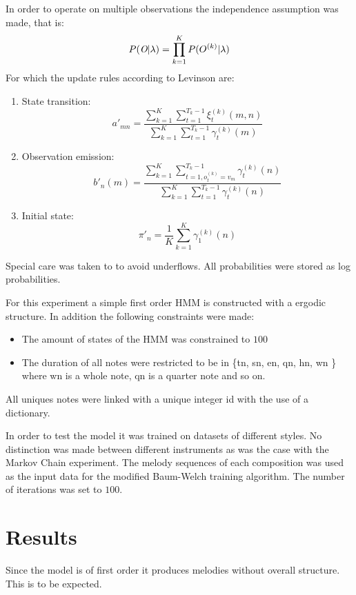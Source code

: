 In order to operate on multiple observations the independence assumption was made, that is:
\[ P(\emph{O} | \lambda) = \prod_{k=1}^K P(O^{(k)} | \lambda) \]
For which the update rules according to Levinson are:
\begin{enumerate}
\item State transition:
\[ a'_{mn} = \frac{\sum^K_{k=1} \sum^{T_k -1 }_{t=1} \xi^{(k)}_t (m,n)}{\sum^K_{k=1} \sum^{T_k-1}_{t=1} \gamma_t^{(k)}(m)} \]

\item Observation emission:
\[ b'_n (m) = \frac{\sum^K_{k=1} \sum^{T_k -1 }_{t=1, o_t^{(k)} = v_m} \gamma^{(k)}_t (n)}{\sum^K_{k=1} \sum^{T_k-1}_{t=1} \gamma_t^{(k)}(n)} \]

\item Initial state:
\[ \pi'_n = \frac{1}{K} \sum^K_{k=1} \gamma_1^{(k)}(n)  \]

\end{enumerate}

Special care was taken to to avoid underflows. All probabilities were stored as log probabilities.


For this experiment a simple first order \ac{HMM} is constructed with a ergodic structure. In addition the following constraints were made:
\begin{itemize}
\item The amount of states of the \ac{HMM} was constrained to $100$
\item The duration of all notes were restricted to be in \{tn, sn, en, qn, hn, wn \} where wn is a whole note, qn is a quarter note and so on. 
\end{itemize}

All uniques notes were linked with a unique integer id with the use of a dictionary. 

In order to test the model it was trained on datasets of different styles. No distinction was made between different instruments as was the case with the Markov Chain experiment.
The melody sequences of each composition was used as the input data for the modified Baum-Welch training algorithm. The number of iterations was set to $100$.


\section{Results}
Since the model is of first order it produces melodies without overall structure. This is to be expected.


